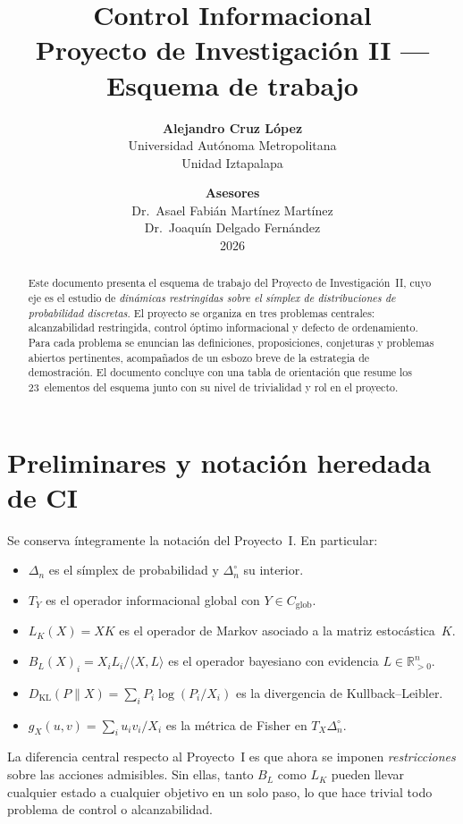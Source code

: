 \documentclass[12pt]{article}
\title{Control Informacional\\
\large Proyecto de Investigación II --- Esquema de trabajo}
\author{
\textbf{Alejandro Cruz López} \\
Universidad Autónoma Metropolitana \\
Unidad Iztapalapa
}
\date{
\vspace{1em}
\textbf{Asesores} \\[0.3em]
Dr.\ Asael Fabián Martínez Martínez \\
Dr.\ Joaquín Delgado Fernández \\
\vspace{1em}
2026
}
\begin{document}
\maketitle

\begin{abstract}
Este documento presenta el esquema de trabajo del Proyecto de Investigación~II,
cuyo eje es el estudio de \emph{dinámicas restringidas sobre el símplex de
distribuciones de probabilidad discretas}. El proyecto se organiza en tres
problemas centrales: alcanzabilidad restringida, control óptimo informacional y
defecto de ordenamiento. Para cada problema se enuncian las definiciones,
proposiciones, conjeturas y problemas abiertos pertinentes, acompañados de un
esbozo breve de la estrategia de demostración. El documento concluye con una
tabla de orientación que resume los 23~elementos del esquema junto con su nivel
de trivialidad y rol en el proyecto.
\end{abstract}

\tableofcontents
\newpage

\section{Preliminares y notación heredada de CI}

Se conserva íntegramente la notación del Proyecto~I. En particular:
\begin{itemize}[nosep]
  \item $\Delta_n$ es el símplex de probabilidad y $\Delta_n^\circ$ su interior.
  \item $T_Y$ es el operador informacional global con $Y\in C_{\mathrm{glob}}$.
  \item $L_K(X)=XK$ es el operador de Markov asociado a la matriz estocástica~$K$.
  \item $B_L(X)_i = X_iL_i/\langle X,L\rangle$ es el operador bayesiano con
        evidencia $L\in\mathbb{R}_{>0}^n$.
  \item $D_{\mathrm{KL}}(P\|X)=\sum_i P_i\log(P_i/X_i)$ es la divergencia de
        Kullback--Leibler.
  \item $g_X(u,v)=\sum_i u_iv_i/X_i$ es la métrica de Fisher en $T_X\Delta_n^\circ$.
\end{itemize}

La diferencia central respecto al Proyecto~I es que ahora se imponen
\emph{restricciones} sobre las acciones admisibles. Sin ellas, tanto $B_L$ como
$L_K$ pueden llevar cualquier estado a cualquier objetivo en un solo paso, lo que
hace trivial todo problema de control o alcanzabilidad.
\end{document}
